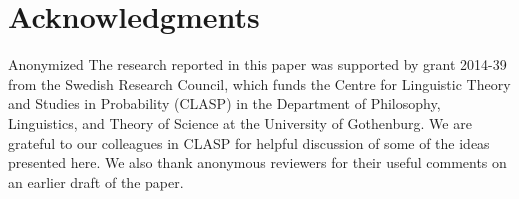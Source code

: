 \documentclass[a4paper,11pt]{article}
\begin{document}
\section*{Acknowledgments}

\ifanon
Anonymized
\else
The research reported in this paper was supported by grant 2014-39 from the
Swedish Research Council, which funds the Centre for Linguistic Theory and
Studies in Probability (CLASP) in the Department of Philosophy, Linguistics,
and Theory of Science at the University of Gothenburg. We are grateful to
our colleagues in CLASP for helpful discussion of some of the ideas presented
here. We also thank anonymous reviewers for their useful comments on an
earlier draft of the paper.
\fi





\end{document}
